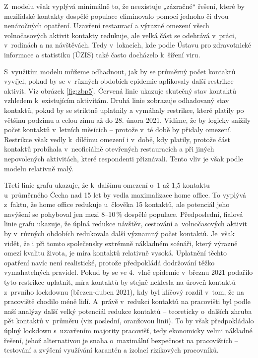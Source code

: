 Z modelu však vyplývá minimálně to, že neexistuje „zázračné“ řešení, které by mezilidské kontakty dospělé populace eliminovalo pomocí jednoho či dvou nenáročných opatření. Uzavření restaurací a výrazné omezení všech volnočasových aktivit kontakty redukuje, ale velká část se odehrává v práci, v rodinách a na návštěvách. Tedy v lokacích, kde podle Ústavu pro zdravotnické informace a statistiku (ÚZIS) také často docházelo k šíření viru.

S využitím modelu můžeme odhadnout, jak by se průměrný počet kontaktů vyvíjel, pokud by se v různých obdobích epidemie aplikovaly další restrikce aktivit. Viz obrázek \ref{fig:zbp5}. Červená linie ukazuje skutečný stav kontaktů vzhledem k existujícím aktivitám. Druhá linie zobrazuje odhadovaný stav kontaktů, pokud by se striktně uplatnily a vymáhaly restrikce, které platily po většinu podzimu a celou zimu až do 28. února 2021. Vidíme, že by logicky snížily počet kontaktů v letních měsících – protože v té době by přidaly omezení. Restrikce však vedly k dílčímu omezení i v době, kdy platily, protože část kontaktů probíhala v neoficiálně otevřených restauracích a při jiných nepovolených aktivitách, které respondenti přiznávali. Tento vliv je však podle modelu relativně malý. 

Třetí linie grafu ukazuje, že k dalšímu omezení o~1 až 1,5 kontaktu u~průměrného Čecha nad 15 let by vedla maximalizace home office. To vyplývá z faktu, že home office redukuje u člověka 15 kontaktů, ale potenciál jeho navýšení se pohyboval jen mezi 8--10\,\% dospělé populace. Předposlední, fialová linie grafu ukazuje, že úplná redukce návštěv, cestování a volnočasových aktivit by v různých obdobích redukovala další významný počet kontaktů. Je však vidět, že i při tomto společensky extrémně nákladném scénáři, který výrazně omezí kvalitu života, je míra kontaktů relativně vysoká. Uplatnění těchto opatření navíc není realistické, protože předpokládá dodržování těžko vymahatelných pravidel. Pokud by se ve 4. vlně epidemie v březnu 2021 podařilo tyto restrikce uplatnit, míra kontaktů by stejně neklesla na úroveň kontaktů z prvního lockdownu (březen-duben 2021), kdy byl klíčový rozdíl v tom, že na pracoviště chodilo méně lidí. A~právě v redukci kontaktů na pracovišti byl podle naší analýzy další velký potenciál redukce kontaktů – teoreticky o~dalších zhruba pět kontaktů v průměru (viz poslední, oranžovou linii). To by však předpokládalo úplný lockdown s uzavřením majority pracovišť, tedy ekonomicky velmi nákladné řešení, jehož alternativou je snaha o maximální bezpečnost na pracovištích – testování a zvýšení využívání karantén a izolací rizikových pracovníků.

